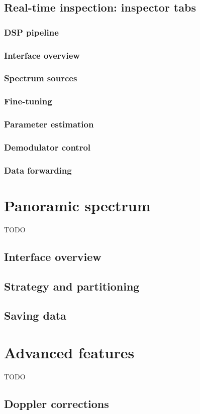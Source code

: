 \documentclass{ol-softwaremanual}
\begin{document}
\section{Real-time inspection: inspector tabs}
\subsection{DSP pipeline}
\subsection{Interface overview}
\subsection{Spectrum sources}
\subsection{Fine-tuning}
\subsection{Parameter estimation}
\subsection{Demodulator control}
\subsection{Data forwarding}

\chapter{Panoramic spectrum}
TODO
\section{Interface overview}
\section{Strategy and partitioning}
\section{Saving data}

\chapter{Advanced features}
TODO
\section{Doppler corrections}
\end{document}
